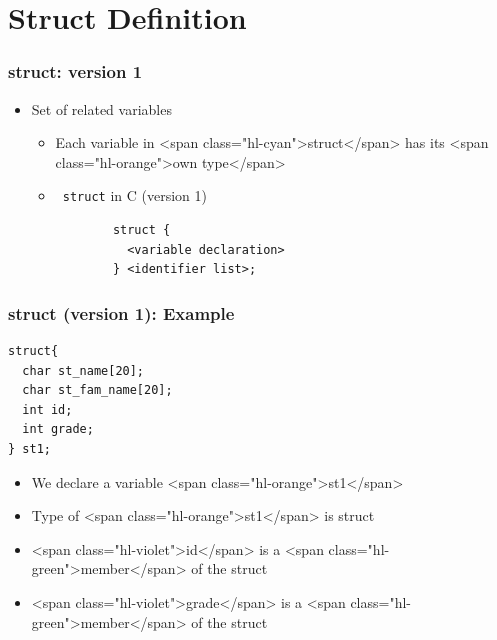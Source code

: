 \documentclass{../c-lecture}
\begin{document}
\section{Struct Definition}

\begin{frame}[fragile]
  \frametitle{struct: version 1}
  \begin{itemize}
    \item Set of related variables
    \begin{itemize}
      \item
        Each variable in <span class="hl-cyan">struct</span> has its
        <span class="hl-orange">own type</span>

      \item \texttt{\color{Cyan} struct} in C (version 1)
      \begin{verbatim}
        struct {
          <variable declaration>
        } <identifier list>;
      \end{verbatim}
    \end{itemize}
  \end{itemize}
\end{frame}

\begin{frame}[fragile]
  \frametitle{struct (version 1): Example}
  \begin{verbatim}
struct{
  char st_name[20];
  char st_fam_name[20];
  int id;
  int grade;
} st1;
  \end{verbatim}
  \begin{itemize}
    \item We declare a variable <span class="hl-orange">st1</span>
    \item Type of <span class="hl-orange">st1</span> is struct
    \item
      <span class="hl-violet">id</span> is a
      <span class="hl-green">member</span> of the struct

    \item
      <span class="hl-violet">grade</span> is a
      <span class="hl-green">member</span> of the struct

  \end{itemize}
\end{frame}
\end{document}

